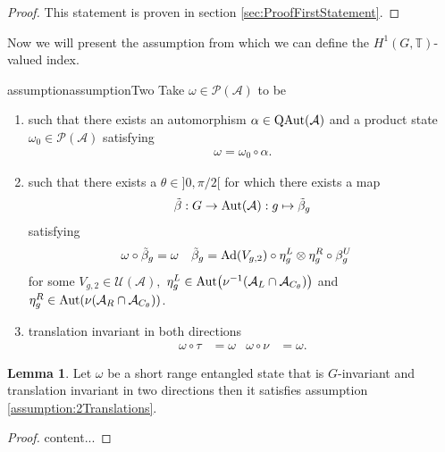 \documentclass[12pt,a4paper,twoside]{article}
\let\originalleft\left
\let\originalright\right
\renewcommand{\left}{\mathopen{}\mathclose\bgroup\originalleft}
\renewcommand{\right}{\aftergroup\egroup\originalright}
\newcommand{\UU}{\mathcal U}
\newcommand{\PP}{\mathcal P}
\newcommand{\TT}{\mathbb T}
\renewcommand{\AA}{\mathcal A}
\newcommand{\Ad}[1]{\textrm{Ad}\left(#1\right)}
\newcommand{\Aut}[1]{\textrm{Aut}\left(#1\right)}
\newcommand{\QAut}[1]{\textrm{QAut}\left(#1\right)}
\theoremstyle{definition}
\newtheorem{lemma}[theorem]{Lemma}
\numberwithin{equation}{section}
\begin{document}
\begin{proof}
	This statement is proven in section \ref{sec:ProofFirstStatement}.
\end{proof}
Now we will present the assumption from which we can define the $H^1(G,\TT)$-valued index.
\begin{restatable}{assumption}{assumptionTwo}\label{assumption:2Translations}
	Take $\omega\in\PP(\AA)$ to be
	\begin{enumerate}
		\item such that there exists an automorphism $\alpha\in\QAut{\AA}$ and a product state $\omega_0\in\PP(\AA)$ satisfying
		\begin{align}
			\omega=\omega_0\circ\alpha.
		\end{align}
		\item such that there exists a $\theta\in]0,\pi/2[$ for which there exists a map
		\begin{equation}
			\tilde\beta:G\rightarrow\Aut{\AA}:g\mapsto\tilde\beta_g
		\end{equation}
		satisfying
		\begin{align}
			\label{eq:2TranslationsCondition3part1}
			\omega\circ\tilde\beta_g&=\omega&\tilde\beta_g&=\Ad{V_{g,2}}\circ\eta^L_g\otimes\eta^R_g\circ\beta^U_g
		\end{align}
		for some $V_{g,2}\in\UU(\AA),$ $\eta^L_g\in\Aut{\nu^{-1}(\AA_L\cap\AA_{C_\theta})}$ and  $\eta^R_g\in\Aut{\nu(\AA_R\cap\AA_{C_\theta})}$.
		\item translation invariant in both directions
		\begin{align}
			\omega\circ\tau&=\omega&\omega\circ\nu&=\omega.
		\end{align}
	\end{enumerate}
\end{restatable}
\begin{lemma}
	Let $\omega$ be a short range entangled state that is $G$-invariant and translation invariant in two directions then it satisfies assumption \ref{assumption:2Translations}.
\end{lemma}
\begin{proof}
	content...
\end{proof}
\end{document}
